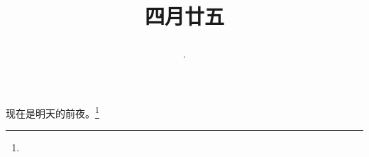 \title{\date[d=1,m=6,y=2024][year:cn-y,年,month:cn,day:cn,日,·,weekday]·四月廿五 }
现在是明天的前夜。\footnote{ }

